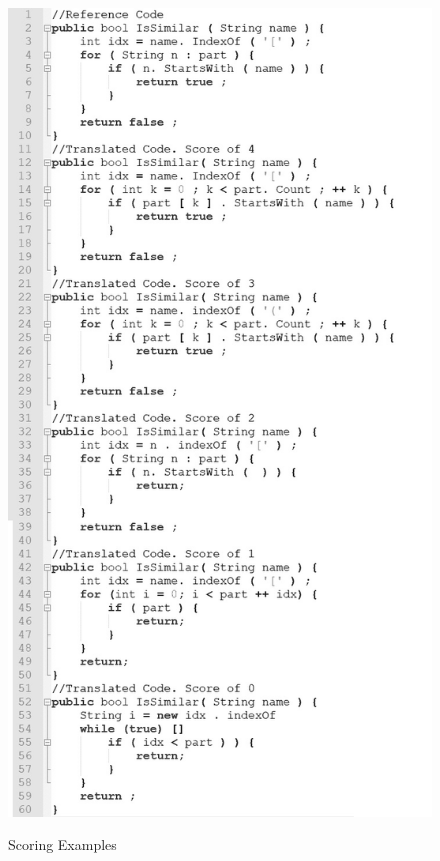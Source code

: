 \begin{figure}
\caption{Scoring Examples}
\centering
\includegraphics{scoreExamples}
\label{fig:scoreEG}
\end{figure}


